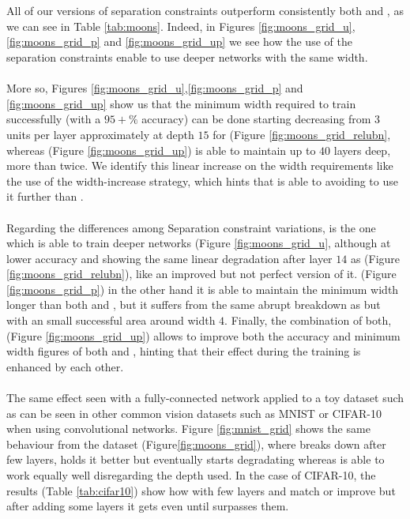\\\\
All of our versions of separation constraints outperform consistently both \ReLU and \ReLUBN, as we can see in Table \ref{tab:moons}. Indeed, in Figures \ref{fig:moons_grid_u}, \ref{fig:moons_grid_p} and \ref{fig:moons_grid_up} we see how the use of the separation constraints enable to use deeper networks with the same width. 
\\\\
More so, Figures \ref{fig:moons_grid_u},\ref{fig:moons_grid_p} and \ref{fig:moons_grid_up} show us that the minimum width required to train successfully (with a $95+\%$ accuracy) can be done  starting decreasing from $3$ units per layer approximately at depth $15$ for \ReLUBN (Figure \ref{fig:moons_grid_relubn}, whereas \SepUnitPoint (Figure \ref{fig:moons_grid_up}) is able to maintain up to $40$ layers deep, more than twice. We identify this linear increase on the width requirements like the use of the width-increase strategy, which hints that \SepPoint is able to avoiding to use it further than \ReLUBN.
\\\\
Regarding the differences among Separation constraint variations, \SepUnit is the one which is able to train deeper networks (Figure \ref{fig:moons_grid_u}, although at lower accuracy and showing the same linear degradation after layer $14$ as \ReLUBN (Figure \ref{fig:moons_grid_relubn}), like an improved but not perfect version of it. \SepPoint (Figure \ref{fig:moons_grid_p}) in the other hand it is able to maintain the minimum width longer than both \ReLUBN and \SepUnit, but it suffers from the same abrupt breakdown as \ReLU but with an small successful area around width $4$. Finally, the combination of both, \SepUnitPoint (Figure \ref{fig:moons_grid_up}) allows to improve both the accuracy and minimum width figures of both \SepUnit and \SepPoint, hinting that their effect during the training is enhanced by each other.
\\\\
The same effect seen with a fully-connected network applied to a toy dataset such as \moons can be seen in other common vision datasets such as MNIST \cite{mnist} or CIFAR-10 \cite{cifar10} when using convolutional networks. Figure \ref{fig:mnist_grid} shows the same behaviour from the \moons dataset (Figure\ref{fig:moons_grid}), where \ReLU breaks down after few layers, \ReLUBN holds it better but eventually starts degradating whereas \SepUnitPoint is able to work equally well disregarding the depth used. In the case of CIFAR-10, the results (Table \ref{tab:cifar10}) show how with few layers \ReLU and \ReLUBN match or improve \SepUnitPoint but after adding some layers it gets even until \SepUnitPoint surpasses them.







\begin{table*}

\\

\caption{}\label{tab:cifar10}
\end{table*}